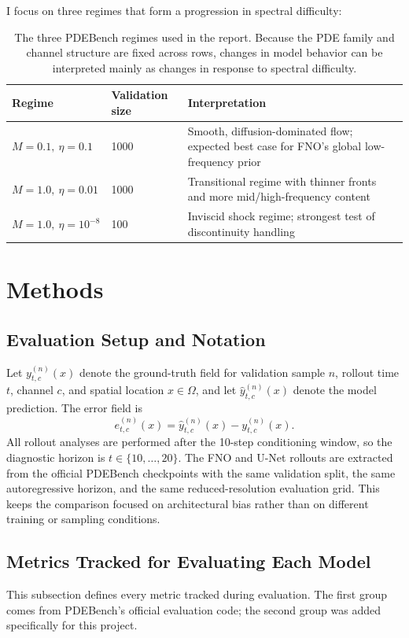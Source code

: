 \documentclass[11pt]{article}
\begin{document}
I focus on three regimes that form a progression in spectral difficulty:

\begin{table}[t]
\centering
\small
\begin{tabular}{@{}llp{7.0cm}@{}}
\toprule
\textbf{Regime} & \textbf{Validation size} & \textbf{Interpretation} \\
\midrule
$M=0.1,\ \eta=0.1$ & 1000 & Smooth, diffusion-dominated flow; expected best case for FNO's global low-frequency prior \\
$M=1.0,\ \eta=0.01$ & 1000 & Transitional regime with thinner fronts and more mid/high-frequency content \\
$M=1.0,\ \eta=10^{-8}$ & 100 & Inviscid shock regime; strongest test of discontinuity handling \\
\bottomrule
\end{tabular}
\caption{The three PDEBench regimes used in the report. Because the PDE family and channel structure are fixed across rows, changes in model behavior can be interpreted mainly as changes in response to spectral difficulty.}
\label{tab:regimes}
\end{table}

\section{Methods}
\subsection{Evaluation Setup and Notation}
Let $y^{(n)}_{t,c}(x)$ denote the ground-truth field for validation sample $n$, rollout time $t$, channel $c$, and spatial location $x \in \Omega$, and let $\hat{y}^{(n)}_{t,c}(x)$ denote the model prediction. The error field is
\[
e^{(n)}_{t,c}(x) = \hat{y}^{(n)}_{t,c}(x) - y^{(n)}_{t,c}(x).
\]
All rollout analyses are performed after the 10-step conditioning window, so the diagnostic horizon is $t \in \{10,\dots,20\}$. The FNO and U-Net rollouts are extracted from the official PDEBench checkpoints with the same validation split, the same autoregressive horizon, and the same reduced-resolution evaluation grid. This keeps the comparison focused on architectural bias rather than on different training or sampling conditions.

\subsection{Metrics Tracked for Evaluating Each Model}
This subsection defines every metric tracked during evaluation. The first group comes from PDEBench's official evaluation code; the second group was added specifically for this project.
\end{document}

